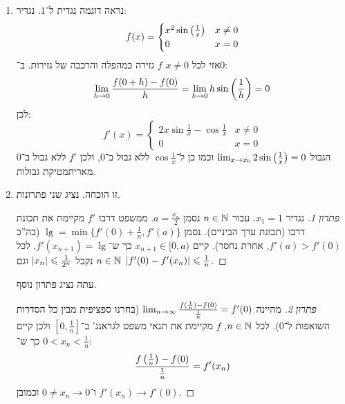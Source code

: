 \documentclass[name=רשימות חשבון דיפרנציאלי ואינטגרלי 1א]{../../../tex/classes/megasumPreamble}
\begin{document}
	\begin{enumerate}
		\item נראה דוגמה נגדית ל־$1$. נגדיר:
		\[ f(x) = \begin{cases}
			x^{2}\sin\left ( \frac{1}{x} \right ) & x \neq 0 \\
			0 & x = 0
		\end{cases} \]
		אזי לכל $x \neq 0$ $f$ גזירה כמהפלה והרכבה של גזירות. ב־$0$:
		\[ \lim_{h \to 0} \frac{f(0 + h) - f(0)}{h} = \lim_{h \to 0} h \sin \left ( \frac{1}{h} \right ) = 0 \]
		לכן:
		\[ f'(x) = \begin{cases}
			2x\sin \frac{1}{x} - \cos \frac{1}{x} & x \neq 0 \\
			0 & x = 0
		\end{cases} \]
		הגבול $\lim_{x \to x_0} 2\sin\left ( \frac{1}{x} \right ) = 0$ וכמו כן ל־$\cos\frac{1}{x}$ ללא גבול ב־$0$, ולכן $f'$ ללא גבול ב־$0$ מאריתמטיקת גבולות.
		\item זו הוכחה. נציג שני פתרונות. \begin{proof}[פתרון 1]
			נגדיר $x_1 =1$.
			עבור $n \in \mathbb{N}$ נסמן $a = \frac{x_n}{2}$. ממשפט דרבו $f'$ מקיימת את תכונת דרבו (תכונת ערך הביניים). נסמן $\lg = \min\{f'(0) + \frac{1}{n}, f'(a)\}$ (בה''כ $f'(a) > f'(0)$, אחרת נחסר). קיים $x_{n + 1} \in [0, a)$ כך ש־$f'(x_{n + 1}) = \lg$. לכל $n \in \mathbb{N}$ נקבל $\left \lvert x_n \right \rvert \leqslant \frac{1}{2^{n}}$ וגם $\left \lvert f'(0) - f'(x_n) \right \rvert \leqslant \frac{1}{n}$.
		\end{proof}
		עתה נציג פתרון נוסף.
		\begin{proof}[פתרון 2]
			מהיינה $\lim_{n \to \infty} \frac{f(\frac{1}{n}) - f(0)}{\frac{1}{n}} = f'(0)$ (בחרנו ספציפית מבין כל הסדרות השואפות ל־$0$). לכל $n \in \mathbb{N}$, $f$ מקיימת את תנאי משפט לגראנג' ב־$[0, \frac{1}{n}]$ ולכן קיים $0 < x_n < \frac{1}{n}$ כך ש־:
			\[ \frac{f\left ( \frac{1}{n} \right ) - f(0)}{\frac{1}{n}} = f'(x_n) \]
			ו־$0 \neq x_n \to 0$ וכמובן $f'(x_n) \to f'(0)$.
		\end{proof}
	\end{enumerate}
\end{document}
